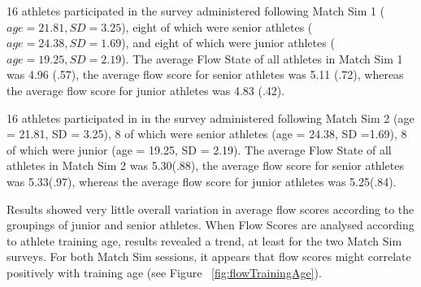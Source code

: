 \begin{CJK}{UTF8}{gbsn}
16 athletes participated in the survey administered following Match Sim 1 ($age = 21.81, SD = 3.25$), eight of which were senior athletes ($age = 24.38, SD =1.69$), and eight of which were junior athletes ($age = 19.25, SD = 2.19$). The average Flow State of all athletes in Match Sim 1 was 4.96 (.57), the average flow score for senior athletes was 5.11 (.72), whereas the average flow score for junior athletes was 4.83 (.42).

16 athletes participated in in the survey administered following Match Sim 2 (age = 21.81, SD = 3.25), 8 of which were senior athletes (age = 24.38, SD =1.69), 8 of which were junior (age = 19.25, SD = 2.19). The average Flow State of all athletes in Match Sim 2 was 5.30(.88), the average flow score for senior athletes was 5.33(.97), whereas the average flow score for junior athletes was 5.25(.84).

Results showed very little overall variation in average flow scores according to the groupings of junior and senior athletes.  When Flow Scores are analysed according to athlete training age, results revealed a trend, at least for the two Match Sim surveys. For both Match Sim sessions, it appears that flow scores might correlate positively with training age (see Figure ~\ref{fig:flowTrainingAge}).


\end{CJK}
